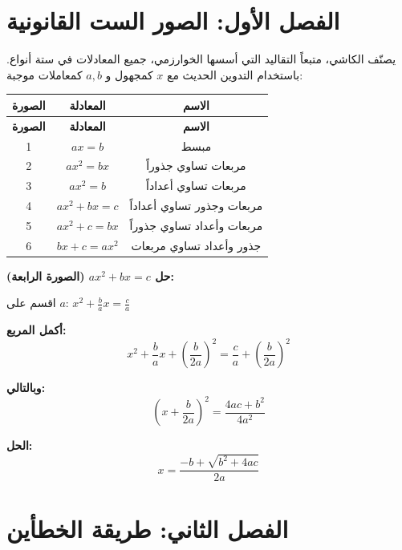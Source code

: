 \documentclass[11pt,a4paper]{book}
\newcommand{\ar}[1]{\arabicfont\beginR #1\endR}
\newenvironment{mathalgo}{%
  \par\vspace{0.3cm}
  \begin{framed}
  \setlength{\parindent}{0pt}
}{%
  \end{framed}
  \par\vspace{0.3cm}
}
\begin{document}
\section{\ar{الفصل الأول: الصور الست القانونية}}

\noindent\ar{يصنّف الكاشي، متبعاً التقاليد التي أسسها الخوارزمي، جميع المعادلات في ستة أنواع. باستخدام التدوين الحديث مع $x$ كمجهول و $a, b$ كمعاملات موجبة:}

\begin{center}
\begin{longtable}{|c|c|c|}
\hline
\textbf{\ar{الصورة}} & \textbf{\ar{المعادلة}} & \textbf{\ar{الاسم}} \\
\hline
\endfirsthead
\hline
\textbf{\ar{الصورة}} & \textbf{\ar{المعادلة}} & \textbf{\ar{الاسم}} \\
\hline
\endhead
1 & $ax = b$ & \ar{مبسط} \\
\hline
2 & $ax^2 = bx$ & \ar{مربعات تساوي جذوراً} \\
\hline
3 & $ax^2 = b$ & \ar{مربعات تساوي أعداداً} \\
\hline
4 & $ax^2 + bx = c$ & \ar{مربعات وجذور تساوي أعداداً} \\
\hline
5 & $ax^2 + c = bx$ & \ar{مربعات وأعداد تساوي جذوراً} \\
\hline
6 & $bx + c = ax^2$ & \ar{جذور وأعداد تساوي مربعات} \\
\hline
\end{longtable}
\end{center}

\begin{mathalgo}
\textbf{\ar{حل} $ax^2 + bx = c$ \ar{(الصورة الرابعة):}}

\ar{اقسم على} $a$: $x^2 + \frac{b}{a}x = \frac{c}{a}$

\vspace{0.3cm}
\textbf{\ar{أكمل المربع:}}
\[
x^2 + \frac{b}{a}x + \left(\frac{b}{2a}\right)^2 = \frac{c}{a} +
\left(\frac{b}{2a}\right)^2
\]

\vspace{0.3cm}
\textbf{\ar{وبالتالي:}}
\[
\left(x + \frac{b}{2a}\right)^2 = \frac{4ac + b^2}{4a^2}
\]

\vspace{0.3cm}
\textbf{\ar{الحل:}}
\[
x = \frac{-b + \sqrt{b^2 + 4ac}}{2a}
\]
\end{mathalgo}

\section{\ar{الفصل الثاني: طريقة الخطأين}}
\end{document}
